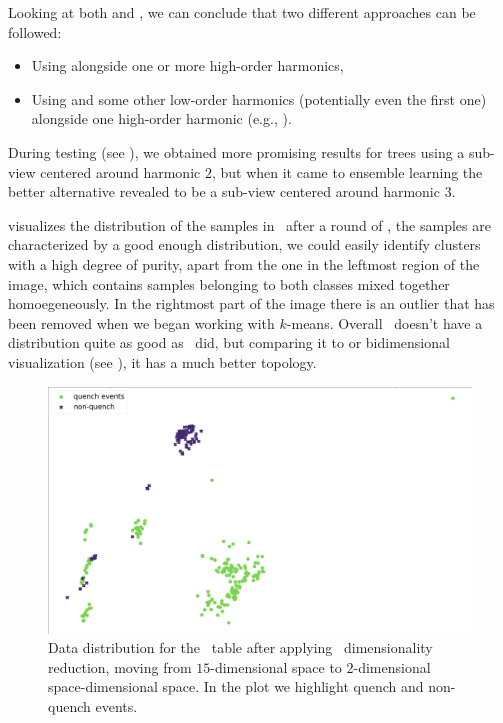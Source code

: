 Looking at both  and , we can conclude that two different
approaches can be followed:
\begin{itemize}
	\item Using \cnmod[2] alongside one or more high-order harmonics,
	\item Using \cnmod[3] and some other low-order harmonics (potentially even the
	      first one) alongside one high-order harmonic (e.g., \cnmod[14]).
\end{itemize}
During testing (see ), we obtained more promising results for trees using a
sub-view centered around harmonic $2$, but when it came to ensemble learning the better alternative
revealed to be a sub-view centered around harmonic $3$.

\medskip

 visualizes the distribution of the samples in \cnmod\ after a round of \pca,
the samples are characterized by a good enough distribution, we could easily identify clusters with
a high degree of purity, apart from the one in the leftmost region of the image, which contains
samples belonging to both classes mixed together homoegeneously. In the rightmost part of the image
there is an outlier that has been removed when we began working with $k$-means. Overall \cnmod\
doesn't have a distribution quite as good as \an\ did, but comparing it to  or
\phin bidimensional visualization (see \Cref{fig:phi-dist}), it has a much better topology.
\begin{figure}[!ht]
	\centering
	\includegraphics[width=0.7\linewidth]{img/Cnmod_distribution.png}
	\caption{Data distribution for the \cnmod\ table after applying \pca\ dimensionality
		reduction, moving from $15$-dimensional space to $2$-dimensional space-dimensional
		space. In the plot we highlight quench and non-quench events.} \label{fig:cnmod-dist}
\end{figure}

